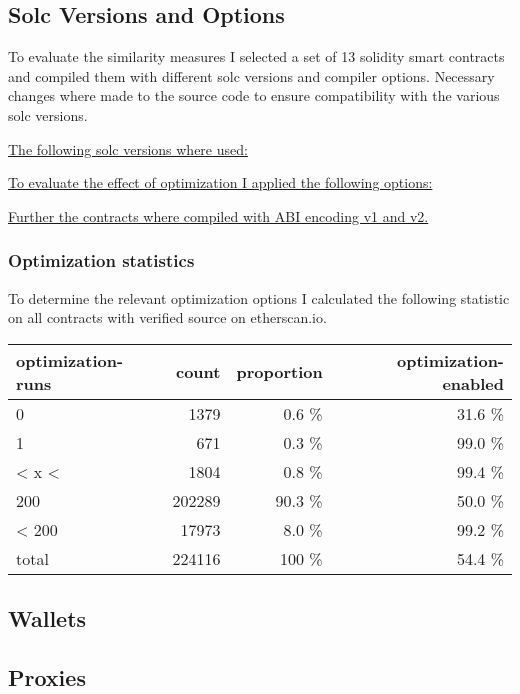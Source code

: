 \documentclass[../main.tex]{subfiles}
\begin{document}
\subsection{Solc Versions and Options}
To evaluate the similarity measures I selected a set of 13 solidity smart contracts and compiled
them with different solc versions and compiler options.
Necessary changes where made to the source code to ensure compatibility with the various solc
versions.

\underline{The following solc versions where used:}
\begin{ol}
  \item {}
  \item {}
  \item {}
  \item {}
\end{ol}
\underline{To evaluate the effect of optimization I applied the following options:}
\begin{ol}
  \item {}
  \item {}
  \item {}
  \item {}
\end{ol}
\underline{Further the contracts where compiled with ABI encoding v1 and v2.}

\subsubsection{Optimization statistics}

To determine the relevant optimization options I calculated the following statistic on all contracts with verified source on etherscan.io.

\begin{tabular}{lrrr}
  optimization-runs & count  & proportion & optimization-enabled \\
  \hline
  0                 & 1379   & 0.6 \%     & 31.6 \%              \\
  1                 & 671    & 0.3 \%     & 99.0 \%              \\
  < x <             & 1804   & 0.8 \%     & 99.4 \%              \\
  200               & 202289 & 90.3 \%    & 50.0 \%              \\
  < 200             & 17973  & 8.0 \%     & 99.2 \%              \\
  \hline
  total             & 224116 & 100 \%     & 54.4 \%
\end{tabular}


\subsection{Wallets}
\subsection{Proxies}
\end{document}

